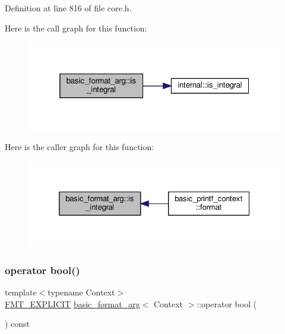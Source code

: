 Definition at line 816 of file core.\+h.

Here is the call graph for this function\+:
\nopagebreak
\begin{figure}[H]
\begin{center}
\leavevmode
\includegraphics[width=319pt]{classbasic__format__arg_af7036c26bebf95df5766215ec9c1ec06_cgraph}
\end{center}
\end{figure}
Here is the caller graph for this function\+:
\nopagebreak
\begin{figure}[H]
\begin{center}
\leavevmode
\includegraphics[width=325pt]{classbasic__format__arg_af7036c26bebf95df5766215ec9c1ec06_icgraph}
\end{center}
\end{figure}
\mbox{\label{classbasic__format__arg_abc1e6f7725cce939c9c94be860cc32e1}} 
\subsubsection{\texorpdfstring{operator bool()}{operator bool()}}
{\footnotesize\ttfamily template$<$typename Context$>$ \\
\hyperlink{core_8h_ac5e450936052d8a4292d6e609e73e2bd}{F\+M\+T\+\_\+\+E\+X\+P\+L\+I\+C\+IT} \hyperlink{classbasic__format__arg}{basic\+\_\+format\+\_\+arg}$<$ Context $>$\+::operator bool (\begin{DoxyParamCaption}{ }\end{DoxyParamCaption}) const\hspace{0.3cm}{\ttfamily [inline]}}



